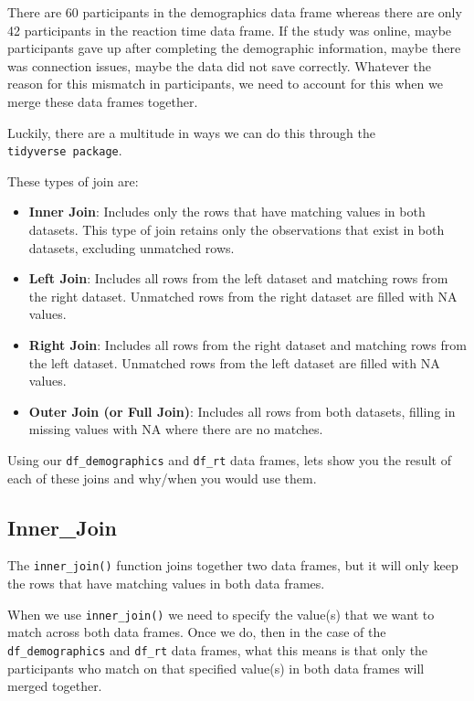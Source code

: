 \documentclass[
]{book}
\begin{document}
There are 60 participants in the demographics data frame whereas there are only 42 participants in the reaction time data frame. If the study was online, maybe participants gave up after completing the demographic information, maybe there was connection issues, maybe the data did not save correctly. Whatever the reason for this mismatch in participants, we need to account for this when we merge these data frames together.

Luckily, there are a multitude in ways we can do this through the \texttt{tidyverse\ package}.

These types of join are:

\begin{itemize}
\item
  \textbf{Inner Join}: Includes only the rows that have matching values in both datasets. This type of join retains only the observations that exist in both datasets, excluding unmatched rows.
\item
  \textbf{Left Join}: Includes all rows from the left dataset and matching rows from the right dataset. Unmatched rows from the right dataset are filled with NA values.
\item
  \textbf{Right Join}: Includes all rows from the right dataset and matching rows from the left dataset. Unmatched rows from the left dataset are filled with NA values.
\item
  \textbf{Outer Join (or Full Join)}: Includes all rows from both datasets, filling in missing values with NA where there are no matches.
\end{itemize}

Using our \texttt{df\_demographics} and \texttt{df\_rt} data frames, lets show you the result of each of these joins and why/when you would use them.

\hypertarget{inner_join}{%
\subsection{Inner\_Join}\label{inner_join}}

The \texttt{inner\_join()} function joins together two data frames, but it will only keep the rows that have matching values in both data frames.

When we use \texttt{inner\_join()} we need to specify the value(s) that we want to match across both data frames. Once we do, then in the case of the \texttt{df\_demographics} and \texttt{df\_rt} data frames, what this means is that only the participants who match on that specified value(s) in both data frames will merged together.
\end{document}
